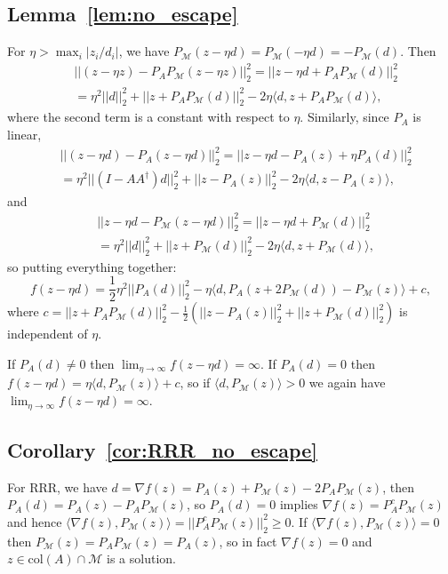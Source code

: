 \documentclass[journal]{IEEEtran}
\theoremstyle{definition}
\theoremstyle{remark}
\theoremstyle{definition}
\theoremstyle{problem}
\theoremstyle{definition}
\newcommand{\col}{\text{col}}
\newcommand{\MM}{\mathcal{M}}
\begin{document}
\subsection{Lemma~\ref{lem:no_escape}}\label{sec:pf_no_escape}
For $\eta>\max_i|z_i/d_i|$, we have $P_{\MM}(z-\eta d) = P_{\MM}(-\eta d) = -P_{\MM}(d)$. Then
\[\begin{aligned} &||(z-\eta z) - P_AP_{\MM}(z-\eta z)||_2^2 = ||z-\eta d + P_AP_{\MM}(d)||_2^2\\
&= \eta^2||d||_2^2 + ||z + P_AP_{\MM}(d)||_2^2 - 2\eta\langle d, z + P_AP_{\MM}(d)\rangle,\end{aligned}\]
where the second term is a constant with respect to $\eta$. Similarly, since $P_A$ is linear,
\[\begin{aligned} &||(z-\eta d) - P_A(z-\eta d)||_2^2 = ||z-\eta d - P_A(z) + \eta P_A(d)||_2^2\\
&= \eta^2||(I-AA^{\dagger})d||_2^2 + ||z-P_A(z)||_2^2 - 2\eta \langle d, z-P_A(z)\rangle,\end{aligned}\]
and
\[\begin{aligned} &||z-\eta d - P_{\MM}(z-\eta d)||_2^2 = ||z-\eta d + P_{\MM}(d)||_2^2\\
&= \eta^2||d||_2^2 + ||z+P_{\MM}(d)||_2^2 - 2\eta\langle d, z+P_{\MM}(d)\rangle,\end{aligned}\]
so putting everything together:
\[ f(z-\eta d) = \frac{1}{2}\eta^2 ||P_A(d)||_2^2 - \eta\langle d, P_A(z + 2P_{\MM}(d)) - P_{\MM}(z)\rangle + c,\]
where $c = ||z + P_AP_{\MM}(d)||_2^2 - \frac{1}{2}\left(||z-P_A(z)||_2^2 + ||z+P_{\MM}(d)||_2^2\right)$ is independent of $\eta$.

If $P_A(d)\neq 0$ then $\lim_{\eta\to\infty}f(z-\eta d)=\infty$. If $P_A(d) = 0$ then $f(z-\eta d) = \eta\langle d, P_{\MM}(z)\rangle + c$, so if $\langle d,P_{\MM}(z)\rangle > 0$ we again have $\lim_{\eta\to\infty}f(z-\eta d)=\infty$.

\subsection{Corollary~\ref{cor:RRR_no_escape}}\label{sec:pf_RRR_no_escape}
For RRR, we have $d=\nabla f(z) = P_A(z) + P_{\MM}(z) - 2P_AP_{\MM}(z)$, then $P_A(d) = P_A(z) - P_AP_{\MM}(z)$, so $P_A(d) = 0$ implies $\nabla f(z) = P_A^cP_{\MM}(z)$ and hence $\langle \nabla f(z), P_{\MM}(z)\rangle = ||P_A^cP_{\MM}(z)||_2^2 \geq 0$. If $\langle \nabla f(z), P_{\MM}(z)\rangle = 0$ then $P_{\MM}(z) = P_AP_{\MM}(z) = P_A(z)$, so in fact $\nabla f(z) = 0$ and $z\in\col(A)\cap\MM$ is a solution.
\end{document}
